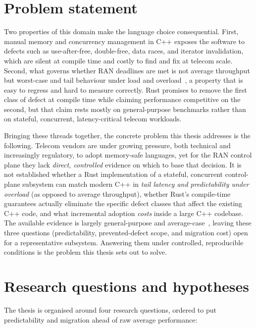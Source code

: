 \documentclass[english,oneside,a4paper,censored,csm,software-track-2020]{HYthesisML}
\begin{document}
\section{Problem statement}
Two properties of this domain make the language choice consequential. First, manual memory and
concurrency management in C++ exposes the software to defects such as use-after-free,
double-free, data races, and iterator invalidation, which are silent at compile time and costly
to find and fix at telecom scale. Second, what governs whether RAN deadlines are met is not
average throughput but worst-case and tail behaviour under load and
overload~\cite{dean2013tail}, a property that is easy to regress and hard to measure correctly.
Rust promises to remove the first class of defect at compile time while claiming performance
competitive on the second, but that claim rests mostly on general-purpose benchmarks rather
than on stateful, concurrent, latency-critical telecom workloads.

Bringing these threads together, the concrete problem this thesis addresses is the following.
Telecom vendors are under growing pressure, both technical and increasingly regulatory, to adopt
memory-safe languages, yet for the RAN control plane they lack \emph{direct, controlled}
evidence on which to base that decision. It is not established whether a Rust implementation of
a stateful, concurrent control-plane subsystem can match modern C++ in \emph{tail latency and
predictability under overload} (as opposed to average throughput), whether Rust's compile-time
guarantees actually eliminate the specific defect classes that affect the existing C++ code,
and what incremental adoption \emph{costs} inside a large C++ codebase. The available evidence
is largely general-purpose and average-case~\cite{balasubramanian2017rust,qin2020rust}, leaving
these three questions (predictability, prevented-defect scope, and migration cost) open for a
representative subsystem. Answering them under controlled, reproducible conditions is the
problem this thesis sets out to solve.

\section{Research questions and hypotheses}\label{sec:rqs}
The thesis is organised around four research questions, ordered to put predictability and
migration ahead of raw average performance:
\end{document}
